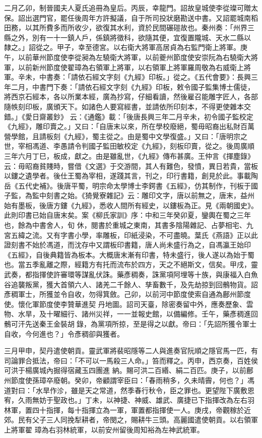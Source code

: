 \begin{pinyinscope}
 二月乙卯，制晉國夫人夏氏追冊為皇后。丙辰，幸龍門。詔故皇城使李從璨可贈太保。詔出選門官，罷任後周年方許擬議，自于所司投狀磨勘送中書。又詔罷城南稻田務，以其所費多而所收少，欲復其水利，資於民間碾磑故也。秦州奏：「州界三縣之外，別有一十一鎮人戶，係鎮將徵科，欲隨其便，宜復置隴城、天水二縣以
 隸之。」詔從之。甲子，幸至德宮。以右衛大將軍高居貞為右監門衛上將軍。庚午，以前華州節度使李從昶為左驍衛大將軍，以前夔州節度使安崇阮為右驍衛大將軍，以前新州節度使翟璋為右領軍上將軍，以右領軍上將軍羅周敬為右威衛上將軍。辛未，中書奏：「請依石經文字刻《九經》印板。」從之。《五代會要》：長興三年二月，中書門下奏：「請依石經文字刻《九經》印板，敕令國子監集博士儒徒，將西京石經本，各以所業本經，廣為抄寫，仔細看讀，然後雇召能雕字匠人，各部隨帙刻印板，廣頒天下。如諸色人要寫經書，並請依所印刻本，不得更使雜本交錯。」《愛日齋叢鈔》
 云：《通鑑》載：「後唐長興三年二月辛未，初令國子監校定《九經》，雕印賣之。」又曰：「自唐末以來，所在學校廢絕，蜀毋昭裔出私財百萬營學館，且請板刻《九經》，蜀主從之。由是蜀中文學復盛。」又曰：「唐明宗之世，宰相馮道、李愚請令判國子監田敏校定《九經》，刻板印賣，從之。後周廣順三年六月丁巳，板成，獻之。由是雖亂世，《九經》傳布甚廣。王仲言《揮塵錄》云：毋昭裔貧賤時，嘗借《文選》于交游間，其人有難色，發憤，異日若貴，當板以鏤之遺學者。後仕王蜀為宰相，遂踐其言，刊之，印行書籍，創見於此。事載陶岳《五代史補》。後唐平蜀，明宗命太學博士李鍔書《五經》，仿其制作，刊板于國子監，為監中刻書之始。《猗覺寮雜記》云：雕印文字，唐以前無之，唐末，益州始有墨板，後唐方鏤《九經》，悉收人間所有經史，以鏤板為正。見《兩朝國史》。此則印書已始自唐末矣。案《柳氏家訓》序：中和三年癸卯夏，鑾輿在蜀之三年也，餘為中書舍人，旬
 休，閱書於重城之東南，其書多陰陽雜記、占夢相宅、九宮五緯之流。又有字書小學，率雕板，印紙浸染，不可盡曉。葉氏《燕語》正以此證刻書不始於馮道，而沈存中又謂板印書籍，唐人尚未盛行為之，自馮瀛王始印《五經》，自後典籍皆為板本。大概唐末漸有印書，特未盛行，後人遂以為始于蜀也。當五季亂離之際，經籍方有托而流布於四方，天之不絕斯文，信矣。甲戌，靈武奏，都指揮使許審環等謀亂伏誅。藥彥稠奏，誅黨項阿埋等十族，與康福入白魚谷追襲叛黨，獲大首領六人、諸羌二千餘人、孳畜數千，及先劫掠到回鶻物貨。詔彥稠軍士，所獲並令自收，勿得箕斂。己卯，以前河中節度使索自通為鄜州節度使。懷化軍節度使李贊華進契
 丹地圖。詔司天臺，除密奏留中外，應奏歷象、雲物、水旱，及十曜細行、諸州災祥，一一並報史館，以備編修。壬午，藥彥稠進回鶻可汗先送秦王金裝胡錄，為黨項所掠，至是得之以獻。帝曰：「先詔所獲令軍士自收，今何進也？」令彥稠卻與獲者。



 三月甲申，契丹遣使朝貢。靈武軍將裴昭隱等二人與進奏官阮順之隱官馬一匹，有司論罪合抵法，帝曰：「不可以一馬殺三人命。」笞而釋之。丙申，西京奏，百姓侯可洪于楊廣城內掘得宿藏玉四團進
 納。賜可洪二百緡、絹二百匹。庚子，以前鄜州節度使孫璋卒廢朝。癸卯，帝顧謂宰臣曰：「春雨稍多，久未晴霽，何也？」馮道對曰：「水旱作沴，雖是天之常道，然季春行秋令，臣之罪也。更望陛下廣敷恩宥，久雨無妨于聖政也。」丁未，以神捷、神威、雄武、廣捷已下指揮改為左右羽林軍，置四十指揮，每十指揮立為一軍，軍置都指揮使一人。庚戌，帝觀稼於近郊。民有父子三人同挽犁耕者，帝閔之，賜耕牛三頭。高麗國遣使朝貢。以右領軍上將軍翟
 璋為右羽林統軍，以前安州留後周知裕為左神武統軍。




\end{pinyinscope}
